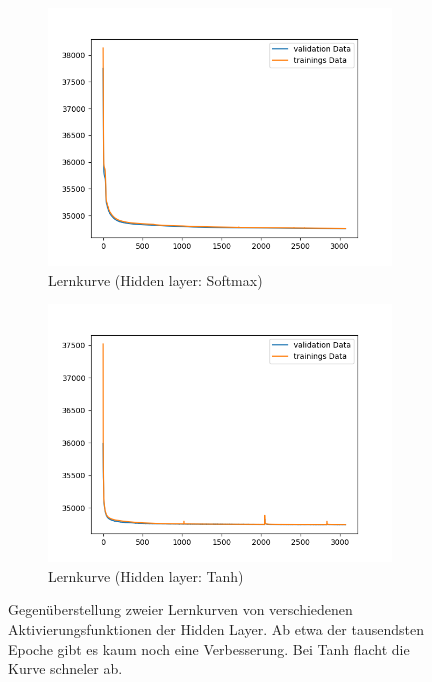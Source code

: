\begin{figure}[ht]
\centering
\begin{subfigure}{0.5\textwidth}
\centering
\includegraphics[width=\linewidth]{pics/lernkurve_activationHidden-softmax_activationOutput-softmax}
\caption{Lernkurve (Hidden layer: Softmax)}
\label{fig:lernkurveSoftmax}
\end{subfigure}%
\begin{subfigure}{0.5\textwidth}
\centering
\includegraphics[width=\linewidth]{pics/lernkurve_activationHidden-tanh_activationOutput-softmax}
\caption{Lernkurve (Hidden layer: Tanh)}
\label{fig:lernkurveTanh}
\end{subfigure}%
\caption[Lernkurven verschiedener Aktivierungsfkt. der Hidden Layer]{Gegenüberstellung zweier Lernkurven von verschiedenen Aktivierungsfunktionen der Hidden Layer. Ab etwa der tausendsten Epoche gibt es kaum noch eine Verbesserung. Bei Tanh flacht die Kurve schneler ab.}
\label{fig:lernkurven}
\end{figure}



